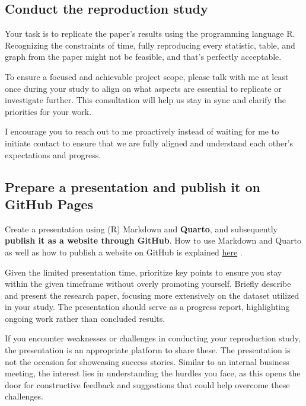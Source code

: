 \documentclass[
  a4paper,
  onecolumn,
  oneside]{scrartcl}
\begin{document}
\subsection{Conduct the reproduction
study}\label{conduct-the-reproduction-study}

Your task is to replicate the paper's results using the programming
language R. Recognizing the constraints of time, fully reproducing every
statistic, table, and graph from the paper might not be feasible, and
that's perfectly acceptable.

To ensure a focused and achievable project scope, please talk with me at
least once during your study to align on what aspects are essential to
replicate or investigate further. This consultation will help us stay in
sync and clarify the priorities for your work.

I encourage you to reach out to me proactively instead of waiting for me
to initiate contact to ensure that we are fully aligned and understand
each other's expectations and progress.

\subsection{Prepare a presentation and publish it on GitHub
Pages}\label{prepare-a-presentation-and-publish-it-on-github-pages}

Create a presentation using (R) Markdown and \textbf{Quarto}, and
subsequently \textbf{publish it as a website through GitHub}. How to use
Markdown and Quarto as well as how to publish a website on GitHub is
explained \href{https://hubchev.github.io/dsbl/}{here}
\citep[see][]{Huber2024Data}.

Given the limited presentation time, prioritize key points to ensure you
stay within the given timeframe without overly promoting yourself.
Briefly describe and present the research paper, focusing more
extensively on the dataset utilized in your study. The presentation
should serve as a progress report, highlighting ongoing work rather than
concluded results.

If you encounter weaknesses or challenges in conducting your
reproduction study, the presentation is an appropriate platform to share
these. The presentation is not the occasion for showcasing success
stories. Similar to an internal business meeting, the interest lies in
understanding the hurdles you face, as this opens the door for
constructive feedback and suggestions that could help overcome these
challenges.
\end{document}
